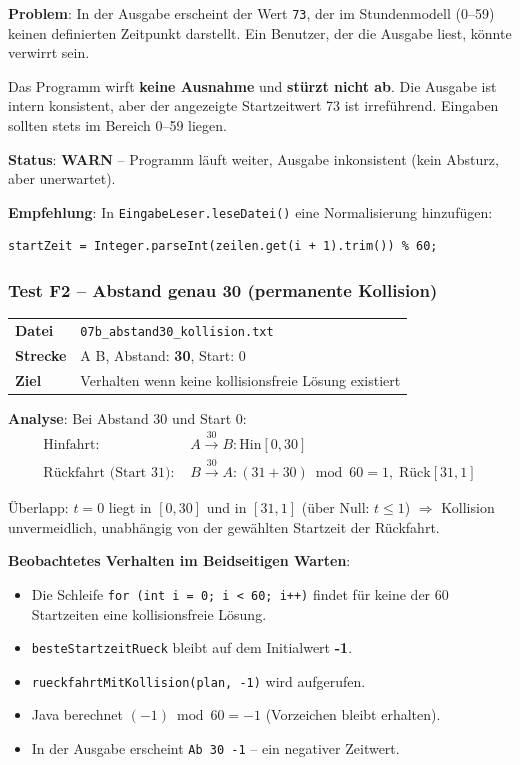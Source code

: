 \documentclass[12pt,a4paper]{article}
\newcommand{\warn}{\textcolor{warnorng}{\textbf{WARN}}}
\begin{document}
\textbf{Problem}: In der Ausgabe erscheint der Wert \texttt{73}, der im Stundenmodell (0--59) keinen definierten Zeitpunkt darstellt. Ein Benutzer, der die Ausgabe liest, könnte verwirrt sein.

\begin{warnbox}
Das Programm wirft \textbf{keine Ausnahme} und \textbf{stürzt nicht ab}. Die Ausgabe ist intern konsistent, aber der angezeigte Startzeitwert 73 ist irreführend. Eingaben sollten stets im Bereich 0--59 liegen.
\end{warnbox}

\textbf{Status}: \warn{} -- Programm läuft weiter, Ausgabe inkonsistent (kein Absturz, aber unerwartet).

\textbf{Empfehlung}: In \texttt{EingabeLeser.leseDatei()} eine Normalisierung hinzufügen:
\begin{lstlisting}
startZeit = Integer.parseInt(zeilen.get(i + 1).trim()) % 60;
\end{lstlisting}

\subsubsection{Test F2 -- Abstand genau 30 (permanente Kollision)}

\begin{center}
\begin{tabular}{ll}
\toprule
\textbf{Datei} & \texttt{07b\_abstand30\_kollision.txt} \\
\textbf{Strecke} & A B, Abstand: \textbf{30}, Start: 0 \\
\textbf{Ziel} & Verhalten wenn keine kollisionsfreie Lösung existiert \\
\bottomrule
\end{tabular}
\end{center}

\textbf{Analyse}: Bei Abstand 30 und Start 0:
\begin{align*}
\text{Hinfahrt: } & A \xrightarrow{30} B: \text{Hin} [0, 30] \\
\text{Rückfahrt (Start 31): } & B \xrightarrow{30} A: (31+30)\bmod60=1,\; \text{Rück} [31, 1]
\end{align*}

Überlapp: $t=0$ liegt in $[0,30]$ und in $[31,1]$ (über Null: $t \leq 1$) $\Rightarrow$ Kollision unvermeidlich, unabhängig von der gewählten Startzeit der Rückfahrt.

\textbf{Beobachtetes Verhalten im Beidseitigen Warten}:
\begin{itemize}
    \item Die Schleife \texttt{for (int i = 0; i < 60; i++)} findet für keine der 60 Startzeiten eine kollisionsfreie Lösung.
    \item \texttt{besteStartzeitRueck} bleibt auf dem Initialwert \textbf{-1}.
    \item \texttt{rueckfahrtMitKollision(plan, -1)} wird aufgerufen.
    \item Java berechnet $(-1) \bmod 60 = -1$ (Vorzeichen bleibt erhalten).
    \item In der Ausgabe erscheint \texttt{Ab 30  -1} -- ein negativer Zeitwert.
\end{itemize}
\end{document}
